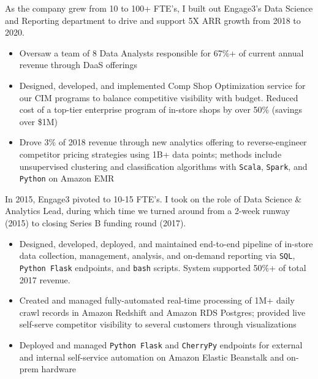 \documentclass[]{deedy-resume-openfont}
\begin{document}
As the company grew from 10 to 100+ FTE's, I built out Engage3's Data Science and Reporting department to drive and support 5X ARR growth from 2018 to 2020. %
\begin{itemize} %
\item Oversaw a team of 8 Data Analysts responsible for 67\%+ of current annual revenue through DaaS offerings
\item Designed, developed, and implemented Comp Shop Optimization service for our CIM programs to balance competitive visibility with budget.  Reduced cost of a top-tier enterprise program of in-store shops by over 50\% (savings over \$1M)
\item Drove 3\% of 2018 revenue through new analytics offering to reverse-engineer competitor pricing strategies using 1B+ data points; methods include unsupervised clustering and classification algorithms with \verb|Scala|, \verb|Spark|, and \verb|Python| on Amazon EMR
\end{itemize} %

\sectionsep

\newpage
{}
In 2015, Engage3 pivoted to 10-15 FTE's.  I took on the role of Data Science \& Analytics Lead, during which time we turned around from a 2-week runway (2015) to closing Series B funding round (2017).
\begin{itemize} %
\item Designed, developed, deployed, and maintained end-to-end pipeline of in-store data collection, management, analysis, and on-demand reporting via \verb|SQL|, \verb|Python Flask| endpoints, and \verb|bash| scripts.  System supported 50\%+ of total 2017 revenue.
\item Created and managed fully-automated real-time processing of 1M+ daily crawl records in Amazon Redshift and Amazon RDS Postgres; provided live self-serve competitor visibility to several customers through visualizations
\item Deployed and managed \verb|Python Flask| and \verb|CherryPy| endpoints for external and internal self-service automation on Amazon Elastic Beanstalk and on-prem hardware
\end{itemize} %
\end{document}

